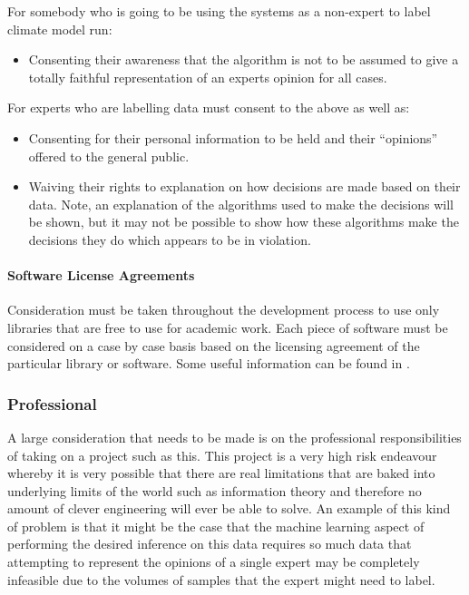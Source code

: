 \documentclass[11pt]{article} %
\numberwithin{equation}{section}
\begin{document}
For somebody who is going to be using the systems as a non-expert
to label climate model run:
\begin{itemize}
\item Consenting their awareness that the algorithm is not to be assumed
to give a totally faithful representation of an experts opinion for
all cases.
\end{itemize}
For experts who are labelling data must consent to the above as well
as:
\begin{itemize}
\item Consenting for their personal information to be held and their ``opinions''
offered to the general public.
\item Waiving their rights to explanation on how decisions are made based
on their data. Note, an explanation of the algorithms used to make
the decisions will be shown, but it may not be possible to show how
these algorithms make the decisions they do which appears to be in
violation.
\end{itemize}

\paragraph{Software License Agreements}

Consideration must be taken throughout the development process to use
only libraries that are free to use for academic work. Each piece of software must 
be considered on a case by case basis based on the licensing agreement of
the particular library or software. Some useful information can be found in \cite{ethicalandlegal}.


\subsubsection{Professional}

A large consideration that needs to be made is on the professional
responsibilities of taking on a project such as this. This project
is a very high risk endeavour whereby it is very possible that there
are real limitations that are baked into underlying limits of the world
such as information theory and therefore no amount of clever engineering
will ever be able to solve. An example of this kind of problem is
that it might be the case that the machine learning aspect of performing
the desired inference on this data requires so much data that attempting
to represent the opinions of a single expert may be completely infeasible
due to the volumes of samples that the expert might need to label. 
\end{document}
